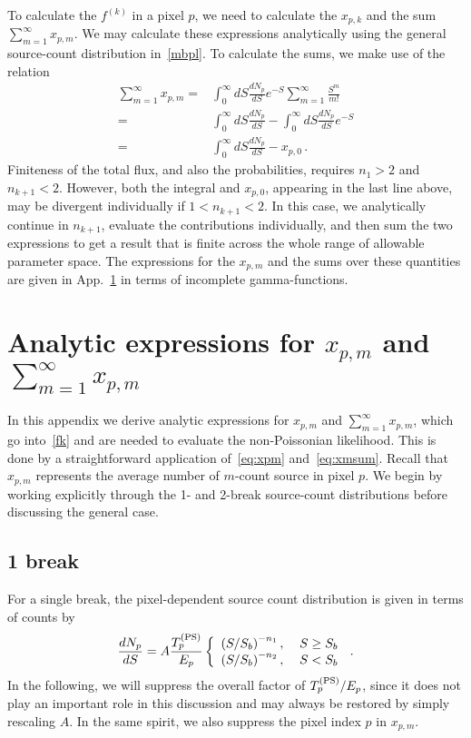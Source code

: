 To calculate the $f^{(k)}$ in a pixel $p$, we need to calculate the $x_{p,k}$ and the sum $\sum_{m=1}^\infty x_{p,m}$.  We may calculate these expressions analytically using the general source-count distribution in~\eqref{mbpl}.  To calculate the sums, we make use of the relation 
\begin{equation}\begin{aligned}
\sum_{m=1}^{\infty} x_{p,m} = &\int_0^{\infty} dS \frac{dN_p}{dS} e^{-S} \sum_{m=1}^{\infty} \frac{S^m}{m!} \\
= &\int_0^{\infty} dS \frac{dN_p}{dS} - \int_0^{\infty} dS \frac{dN_p}{dS} e^{-S} \\
= &\int_0^{\infty} dS \frac{dN_p}{dS} - x_{p,0}\,.
\end{aligned}
\label{eq:xmsum}
\end{equation}
Finiteness of the total flux, and also the probabilities, requires $n_1 > 2$ and $n_{k+1} < 2$.  However,  
both the integral and $x_{p,0}$, appearing in the last line above, may be divergent individually if $1 < n_{k+1} < 2$.  In this case, we analytically continue in $n_{k+1}$, evaluate the contributions individually, and then sum the two expressions to get a result that is finite across the whole range of allowable parameter space.  The expressions for the $x_{p,m}$ and the sums over these quantities are given in App.~\ref{xmcalc} in terms of incomplete gamma-functions.


\section{Analytic expressions for $x_{p,m}$ and $\sum_{m=1}^{\infty} x_{p,m}$}
\label{xmcalc}

In this appendix we derive analytic expressions for $x_{p,m}$ and $\sum_{m=1}^{\infty} x_{p,m}$, which  go into~\eqref{fk} and are needed to evaluate the non-Poissonian likelihood.  This is done by a straightforward application of~\eqref{eq:xpm} and~\eqref{eq:xmsum}. Recall that $x_{p,m} $ represents the average number of $m$-count source in pixel $p$. We begin by working explicitly through the 1- and 2-break source-count distributions before discussing the general case.

\subsection{1 break}
For a single break, the pixel-dependent source count distribution is given in terms of counts by
\begin{equation}
\frac{dN_p}{dS} = A \frac{T_p^{({\rm PS})}}{E_p} \left\{ \begin{array}{l} \left(S/S_b\right)^{-n_1},\;\;\;\; S \geq S_b \\ \left(S/S_b\right)^{-n_2},\;\;\;\; S < S_b \end{array} \right.\,.
\end{equation}
In the following, we will suppress the overall factor of $T_p^{({\rm PS})}/E_p$, since it does not play an important role in this discussion and may always be restored by simply rescaling $A$.  In the same spirit, we also suppress the pixel index $p$ in $x_{p,m}$.   

